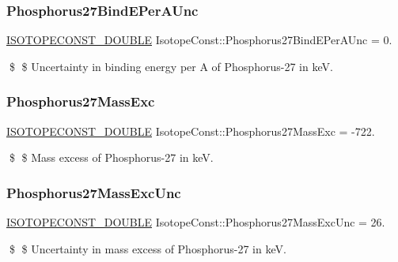 \subsubsection{\texorpdfstring{Phosphorus27\+Bind\+E\+Per\+A\+Unc}{Phosphorus27BindEPerAUnc}}
{\footnotesize\ttfamily \mbox{\hyperlink{group___isotope_const-_macros_ga8f45a7272ce02c0b4c65c44636ed719a}{I\+S\+O\+T\+O\+P\+E\+C\+O\+N\+S\+T\+\_\+\+D\+O\+U\+B\+LE}} Isotope\+Const\+::\+Phosphorus27\+Bind\+E\+Per\+A\+Unc = 0.}

\$ \$ Uncertainty in binding energy per A of Phosphorus-\/27 in keV. \mbox{\label{group___isotope_const-_phosphorus-_p27_ga6d2fa83895ee577deef090c5bb237d96}} 
\subsubsection{\texorpdfstring{Phosphorus27\+Mass\+Exc}{Phosphorus27MassExc}}
{\footnotesize\ttfamily \mbox{\hyperlink{group___isotope_const-_macros_ga8f45a7272ce02c0b4c65c44636ed719a}{I\+S\+O\+T\+O\+P\+E\+C\+O\+N\+S\+T\+\_\+\+D\+O\+U\+B\+LE}} Isotope\+Const\+::\+Phosphorus27\+Mass\+Exc = -\/722.}

\$ \$ Mass excess of Phosphorus-\/27 in keV. \mbox{\label{group___isotope_const-_phosphorus-_p27_ga4be70a497468170ffcc0eb30f7ee76df}} 
\subsubsection{\texorpdfstring{Phosphorus27\+Mass\+Exc\+Unc}{Phosphorus27MassExcUnc}}
{\footnotesize\ttfamily \mbox{\hyperlink{group___isotope_const-_macros_ga8f45a7272ce02c0b4c65c44636ed719a}{I\+S\+O\+T\+O\+P\+E\+C\+O\+N\+S\+T\+\_\+\+D\+O\+U\+B\+LE}} Isotope\+Const\+::\+Phosphorus27\+Mass\+Exc\+Unc = 26.}

\$ \$ Uncertainty in mass excess of Phosphorus-\/27 in keV. \mbox{\label{group___isotope_const-_phosphorus-_p27_ga59fb185dfa1e5741327aa7c59a1b6470}} 
